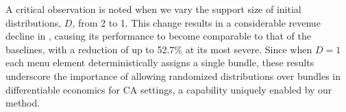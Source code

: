 A critical observation is noted when we vary the support size of initial distributions, $D$, from 2 to 1. This change results in a considerable revenue decline in \name, causing its performance to become comparable to that of the baselines, with a reduction of up to 52.7\% at its most severe. Since when $D=1$ each menu element deterministically assigns a single bundle, these results underscore the importance of allowing randomized distributions over bundles in differentiable economics for CA settings, a capability uniquely enabled by our method.




